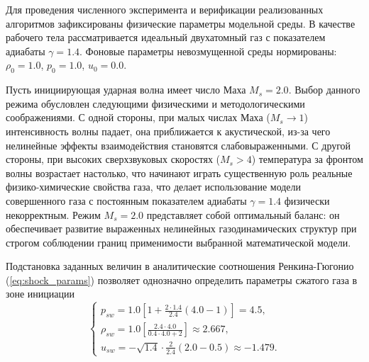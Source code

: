 \documentclass[a4paper,14pt]{extarticle}
\theoremstyle{theorem}
\theoremstyle{lemma}
\begin{document}


Для проведения численного эксперимента и верификации реализованных алгоритмов зафиксированы физические параметры модельной среды. В качестве рабочего тела рассматривается идеальный двухатомный газ с показателем адиабаты $\gamma = 1.4$. Фоновые параметры невозмущенной среды нормированы: $\rho_0 = 1.0$, $p_0 = 1.0$, $u_0 = 0.0$.

Пусть инициирующая ударная волна имеет число Маха $M_s = 2.0$. Выбор данного режима обусловлен следующими физическими и методологическими соображениями. С одной стороны, при малых числах Маха ($M_s \to 1$) интенсивность волны падает, она приближается к акустической, из-за чего нелинейные эффекты взаимодействия становятся слабовыраженными. С другой стороны, при высоких сверхзвуковых скоростях ($M_s > 4$) температура за фронтом волны возрастает настолько, что начинают играть существенную роль реальные физико-химические свойства газа, что делает использование модели совершенного газа с постоянным показателем адиабаты $\gamma = 1.4$ физически некорректным. Режим $M_s = 2.0$ представляет собой оптимальный баланс: он обеспечивает развитие выраженных нелинейных газодинамических структур при строгом соблюдении границ применимости выбранной математической модели.

Подстановка заданных величин в аналитические соотношения Ренкина-Гюгонио (\ref{eq:shock_params}) позволяет однозначно определить параметры сжатого газа в зоне инициации
\begin{equation}
\label{eq:shock_numbers}
\begin{cases}
    \displaystyle p_{sw} = 1.0 \left[ 1 + \frac{2 \cdot 1.4}{2.4}(4.0 - 1) \right] = 4.5, \\[10pt]
    \displaystyle \rho_{sw} = 1.0 \left[ \frac{2.4 \cdot 4.0}{0.4 \cdot 4.0 + 2} \right] \approx 2.667, \\[10pt]
    \displaystyle u_{sw} = -\sqrt{1.4} \cdot \frac{2}{2.4} \left( 2.0 - 0.5 \right) \approx -1.479.
\end{cases}
\end{equation}
\end{document}
